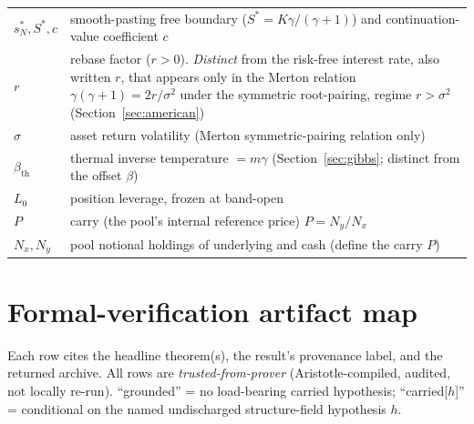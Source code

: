 \documentclass[runningheads]{llncs}
\newcommand{\tfp}{\emph{trusted-from-prover}}
\begin{document}
\begin{center}
\begin{tabularx}{\textwidth}{@{}l >{\raggedright\arraybackslash}X@{}}
$s_{N}^{\ast},S^{\ast},c$ & smooth-pasting free boundary ($S^{\ast}=K\gamma/(\gamma+1)$) and continuation-value coefficient $c$ \\
$r$ & rebase factor ($r>0$). \emph{Distinct} from the risk-free interest rate, also written $r$, that appears only in the Merton relation $\gamma(\gamma+1)=2r/\sigma^{2}$ under the symmetric root-pairing, regime $r>\sigma^{2}$ (Section~\ref{sec:american}) \\
$\sigma$ & asset return volatility (Merton symmetric-pairing relation only) \\
$\beta_{\mathrm{th}}$ & thermal inverse temperature $=m\gamma$ (Section~\ref{sec:gibbs}; distinct from the offset $\beta$) \\
$L_{0}$ & position leverage, frozen at band-open \\
$P$ & carry (the pool's internal reference price) $P=N_{y}/N_{x}$ \\
$N_{x},N_{y}$ & pool notional holdings of underlying and cash (define the carry $P$) \\
\bottomrule
\end{tabularx}
\end{center}

\section{Formal-verification artifact map}\label{app:formal}

Each row cites the headline theorem(s), the result's provenance label, and the
returned archive. All rows are \tfp{} (Aristotle-compiled, audited, not locally
re-run). ``grounded'' = no load-bearing carried hypothesis; ``carried[$h$]'' =
conditional on the named undischarged structure-field hypothesis $h$.
\end{document}
